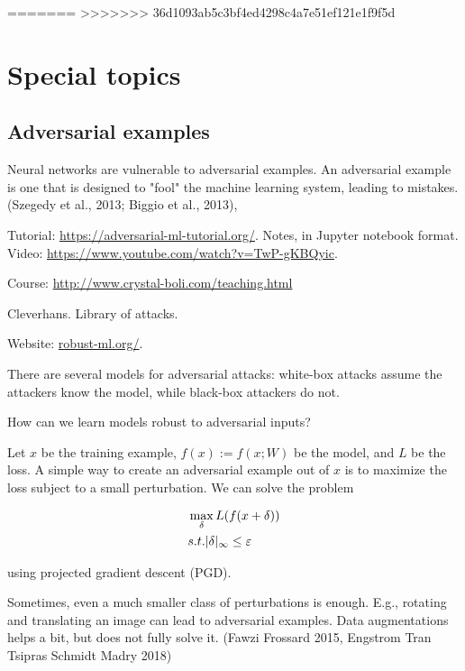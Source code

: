 \documentclass[english]{article}
\begin{document}
=======
>>>>>>> 36d1093ab5c3bf4ed4298c4a7e51ef121e1f9f5d

\eenum 

\section{Special topics}
%
\subsection{Adversarial examples}
%
\bitem
\item Neural networks are vulnerable to adversarial examples. An adversarial example is one that is designed to "fool" the machine learning system, leading to mistakes. (Szegedy et al., 2013; Biggio et al., 2013),

Tutorial: \url{https://adversarial-ml-tutorial.org/}. Notes, in Jupyter notebook format. Video: \url{https://www.youtube.com/watch?v=TwP-gKBQyic}.

Course: \url{http://www.crystal-boli.com/teaching.html}


Cleverhans. Library of attacks. 

Website: \url{robust-ml.org/}.


\item There are several models for adversarial attacks: white-box attacks assume the attackers know the model, while black-box attackers do not. 

\item How can we learn models robust to adversarial inputs?

\item Let $x$ be the training example, $f(x):=f(x;W)$ be the model, and  $L$ be the loss. A simple way to create an adversarial example out of $x$ is to maximize the loss subject to a small perturbation. We can solve the problem 

\begin{align*}
&\max_\delta L(f(x+\delta))\\
&s.t. |\delta|_\infty \le \varepsilon
\end{align*}

using projected gradient descent (PGD).

\item Sometimes, even a much smaller class of perturbations is enough. E.g., rotating and translating an image can lead to adversarial examples. Data augmentations helps a bit, but does not fully solve it. (Fawzi Frossard 2015, Engstrom Tran Tsipras Schmidt Madry 2018) 
\end{document}
